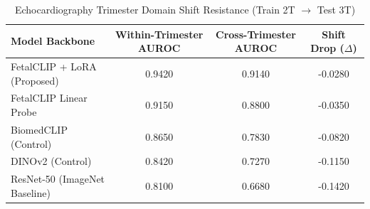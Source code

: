 \begin{table}[t]
\centering
\caption{Echocardiography Trimester Domain Shift Resistance (Train 2T $\to$ Test 3T)}
\label{tab:trimester_shift}
\begin{tabular}{lccc}
\toprule
\textbf{Model Backbone} & \textbf{Within-Trimester AUROC} & \textbf{Cross-Trimester AUROC} & \textbf{Shift Drop ($\Delta$)} \\
\midrule
FetalCLIP + LoRA (Proposed) & 0.9420 & 0.9140 & -0.0280 \\
FetalCLIP Linear Probe & 0.9150 & 0.8800 & -0.0350 \\
BiomedCLIP (Control) & 0.8650 & 0.7830 & -0.0820 \\
DINOv2 (Control) & 0.8420 & 0.7270 & -0.1150 \\
ResNet-50 (ImageNet Baseline) & 0.8100 & 0.6680 & -0.1420 \\
\bottomrule
\end{tabular}
\end{table}
